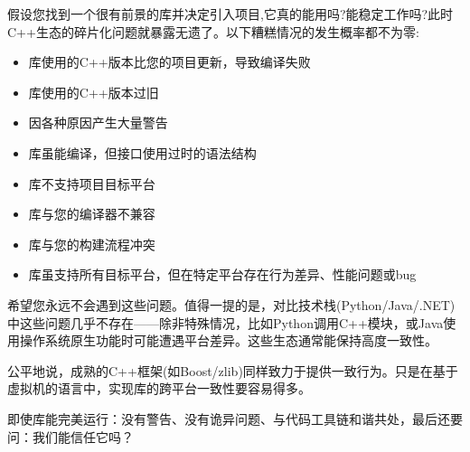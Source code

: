 假设您找到一个很有前景的库并决定引入项目,它真的能用吗?能稳定工作吗?此时C++生态的碎片化问题就暴露无遗了。以下糟糕情况的发生概率都不为零:

\begin{itemize}
\item 
库使用的C++版本比您的项目更新，导致编译失败

\item 
库使用的C++版本过旧

\item 
因各种原因产生大量警告

\item 
库虽能编译，但接口使用过时的语法结构

\item 
库不支持项目目标平台

\item 
库与您的编译器不兼容

\item 
库与您的构建流程冲突

\item 
库虽支持所有目标平台，但在特定平台存在行为差异、性能问题或bug
\end{itemize}

希望您永远不会遇到这些问题。值得一提的是，对比技术栈(Python/Java/.NET)中这些问题几乎不存在——除非特殊情况，比如Python调用C++模块，或Java使用操作系统原生功能时可能遭遇平台差异。这些生态通常能保持高度一致性。

公平地说，成熟的C++框架(如Boost/zlib)同样致力于提供一致行为。只是在基于虚拟机的语言中，实现库的跨平台一致性要容易得多。

即使库能完美运行：没有警告、没有诡异问题、与代码工具链和谐共处，最后还要问：我们能信任它吗？










